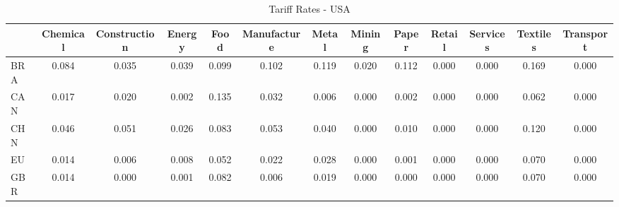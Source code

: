 \begin{table}[htbp]
\centering
\caption{Tariff Rates - USA} 
\label{tab:tariffs_USA}
\begin{tabular}{lcccccccccccc}
  \hline
 & Chemical & Construction & Energy & Food & Manufacture & Metal & Mining & Paper & Retail & Services & Textiles & Transport \\ 
  \hline
BRA & \textcolor[RGB]{25,16,230}{0.084} & \textcolor[RGB]{62,40,193}{0.035} & \textcolor[RGB]{57,37,198}{0.039} & \textcolor[RGB]{21,14,234}{0.099} & \textcolor[RGB]{17,11,238}{0.102} & \textcolor[RGB]{13,8,242}{0.119} & \textcolor[RGB]{83,54,172}{0.020} & \textcolor[RGB]{15,10,240}{0.112} & \textcolor[RGB]{255,165,0}{0.000} & \textcolor[RGB]{255,165,0}{0.000} & \textcolor[RGB]{6,4,249}{0.169} & \textcolor[RGB]{255,165,0}{0.000} \\ 
  CAN & \textcolor[RGB]{91,59,164}{0.017} & \textcolor[RGB]{85,55,170}{0.020} & \textcolor[RGB]{125,81,130}{0.002} & \textcolor[RGB]{8,5,246}{0.135} & \textcolor[RGB]{64,41,191}{0.032} & \textcolor[RGB]{117,76,138}{0.006} & \textcolor[RGB]{255,165,0}{0.000} & \textcolor[RGB]{123,80,132}{0.002} & \textcolor[RGB]{255,165,0}{0.000} & \textcolor[RGB]{255,165,0}{0.000} & \textcolor[RGB]{40,26,215}{0.062} & \textcolor[RGB]{255,165,0}{0.000} \\ 
  CHN & \textcolor[RGB]{53,34,202}{0.046} & \textcolor[RGB]{49,32,206}{0.051} & \textcolor[RGB]{72,47,183}{0.026} & \textcolor[RGB]{28,18,227}{0.083} & \textcolor[RGB]{42,27,212}{0.053} & \textcolor[RGB]{55,36,200}{0.040} & \textcolor[RGB]{255,165,0}{0.000} & \textcolor[RGB]{102,66,153}{0.010} & \textcolor[RGB]{255,165,0}{0.000} & \textcolor[RGB]{255,165,0}{0.000} & \textcolor[RGB]{11,7,244}{0.120} & \textcolor[RGB]{255,165,0}{0.000} \\ 
  EU & \textcolor[RGB]{96,62,159}{0.014} & \textcolor[RGB]{113,73,142}{0.006} & \textcolor[RGB]{108,70,147}{0.008} & \textcolor[RGB]{45,29,210}{0.052} & \textcolor[RGB]{77,50,178}{0.022} & \textcolor[RGB]{70,45,185}{0.028} & \textcolor[RGB]{255,165,0}{0.000} & \textcolor[RGB]{130,84,125}{0.001} & \textcolor[RGB]{255,165,0}{0.000} & \textcolor[RGB]{255,165,0}{0.000} & \textcolor[RGB]{38,25,217}{0.070} & \textcolor[RGB]{255,165,0}{0.000} \\ 
  GBR & \textcolor[RGB]{98,63,157}{0.014} & \textcolor[RGB]{255,165,0}{0.000} & \textcolor[RGB]{128,82,128}{0.001} & \textcolor[RGB]{30,19,225}{0.082} & \textcolor[RGB]{113,73,142}{0.006} & \textcolor[RGB]{87,56,168}{0.019} & \textcolor[RGB]{255,165,0}{0.000} & \textcolor[RGB]{255,165,0}{0.000} & \textcolor[RGB]{255,165,0}{0.000} & \textcolor[RGB]{255,165,0}{0.000} & \textcolor[RGB]{36,23,219}{0.070} & \textcolor[RGB]{255,165,0}{0.000} \\ 

\end{tabular}
\end{table}
